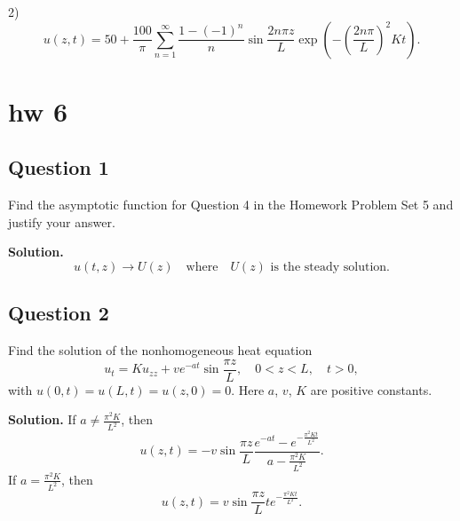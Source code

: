 \documentclass[lang=en,11pt]{template}
\begin{document}
2)
\[
u(z,t) = 50 + \frac{100}{\pi} \sum_{n=1}^{\infty} \frac{1 - (-1)^n}{n} \sin \frac{2n\pi z}{L} \exp\left( -\left( \frac{2n\pi}{L} \right)^2 K t \right).
\]







\chapter{hw 6}
\section*{Question 1}
Find the asymptotic function for Question 4 in the Homework Problem Set 5 and justify your answer.

\textbf{Solution.} 
\[
u(t, z) \to U(z) \quad \text{where} \quad U(z) \text{ is the steady solution.}
\]

\section*{Question 2}
Find the solution of the nonhomogeneous heat equation
\[
u_t = K u_{zz} + v e^{-at} \sin \frac{\pi z}{L}, \quad 0 < z < L, \quad t > 0,
\]
with $u(0,t) = u(L,t) = u(z,0) = 0$. Here $a$, $v$, $K$ are positive constants.

\textbf{Solution.} If $a \neq \frac{\pi^2 K}{L^2}$, then
\[
u(z,t) = -v \sin \frac{\pi z}{L} \frac{e^{-at} - e^{-\frac{\pi^2 K t}{L^2}}}{a - \frac{\pi^2 K}{L^2}}.
\]
If $a = \frac{\pi^2 K}{L^2}$, then
\[
u(z,t) = v \sin \frac{\pi z}{L} t e^{-\frac{\pi^2 K t}{L^2}}.
\]
\end{document}
